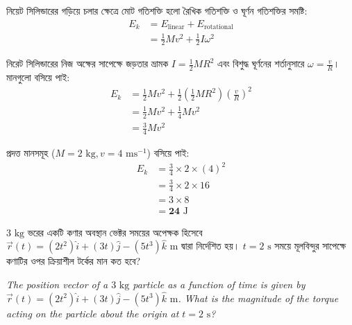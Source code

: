\documentclass[12pt, a4paper]{article}
\begin{document}
\begin{tcolorbox}[solutionbox={সমাধান (Solution)}]
    \noindent
    নিয়েট সিলিন্ডারের গড়িয়ে চলার ক্ষেত্রে মোট গতিশক্তি হলো রৈখিক গতিশক্তি ও ঘূর্ণন গতিশক্তির সমষ্টি:
    \begin{align*}
        E_k &= E_{\text{linear}} + E_{\text{rotational}} \\
            &= \frac{1}{2} M v^2 + \frac{1}{2} I \omega^2
    \end{align*}
    
    নিরেট সিলিন্ডারের নিজ অক্ষের সাপেক্ষে জড়তার ভ্রামক $I = \frac{1}{2} M R^2$ এবং বিশুদ্ধ ঘূর্ণনের শর্তানুসারে $\omega = \frac{v}{R}$। মানগুলো বসিয়ে পাই:
    \begin{align*}
        E_k &= \frac{1}{2} M v^2 + \frac{1}{2} \left(\frac{1}{2} M R^2\right) \left(\frac{v}{R}\right)^2 \\
            &= \frac{1}{2} M v^2 + \frac{1}{4} M v^2 \\
            &= \frac{3}{4} M v^2
    \end{align*}
    
    প্রদত্ত মানসমূহ ($M = 2\text{ kg}, v = 4\text{ ms}^{-1}$) বসিয়ে পাই:
    \begin{align*}
        E_k &= \frac{3}{4} \times 2 \times (4)^2 \\
            &= \frac{3}{4} \times 2 \times 16 \\
            &= 3 \times 8 \\
            &= \mathbf{24}\text{ J}
    \end{align*}
\end{tcolorbox}
\begin{tcolorbox}[questionbox={প্রশ্ন (Question) 39}]
\noindent
$3\text{ kg}$ ভরের একটি কণার অবস্থান ভেক্টর সময়ের অপেক্ষক হিসেবে $\vec{r}(t) = (2t^2)\hat{i} + (3t)\hat{j} - (5t^3)\hat{k}\text{ m}$ দ্বারা নির্দেশিত হয়। $t = 2\text{ s}$ সময়ে মূলবিন্দুর সাপেক্ষে কণাটির ওপর ক্রিয়াশীল টর্কের মান কত হবে?
\vspace{0.8em}
\begin{english}
\noindent\textit{\color{darkgray}
The position vector of a $3\text{ kg}$ particle as a function of time is given by $\vec{r}(t) = (2t^2)\hat{i} + (3t)\hat{j} - (5t^3)\hat{k}\text{ m}$. What is the magnitude of the torque acting on the particle about the origin at $t = 2\text{ s}$?
}
\end{english}
\end{tcolorbox}
\end{document}
